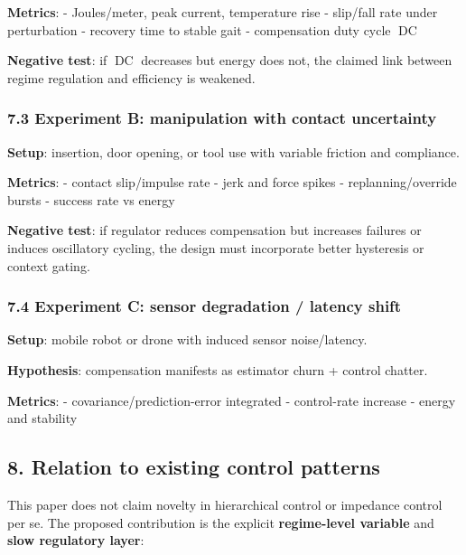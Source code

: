 \documentclass[11pt]{article}
\begin{document}
\textbf{Metrics}: - Joules/meter, peak current, temperature rise - slip/fall rate under perturbation - recovery time to stable gait - compensation duty cycle \(\operatorname{DC}\)

\textbf{Negative test}: if \(\operatorname{DC}\) decreases but energy does not, the claimed link between regime regulation and efficiency is weakened.

\hypertarget{experiment-b-manipulation-with-contact-uncertainty}{%
\subsubsection{7.3 Experiment B: manipulation with contact uncertainty}\label{experiment-b-manipulation-with-contact-uncertainty}}

\textbf{Setup}: insertion, door opening, or tool use with variable friction and compliance.

\textbf{Metrics}: - contact slip/impulse rate - jerk and force spikes - replanning/override bursts - success rate vs energy

\textbf{Negative test}: if regulator reduces compensation but increases failures or induces oscillatory cycling, the design must incorporate better hysteresis or context gating.

\hypertarget{experiment-c-sensor-degradation-latency-shift}{%
\subsubsection{7.4 Experiment C: sensor degradation / latency shift}\label{experiment-c-sensor-degradation-latency-shift}}

\textbf{Setup}: mobile robot or drone with induced sensor noise/latency.

\textbf{Hypothesis}: compensation manifests as estimator churn + control chatter.

\textbf{Metrics}: - covariance/prediction-error integrated - control-rate increase - energy and stability

\hypertarget{relation-to-existing-control-patterns}{%
\subsection{8. Relation to existing control patterns}\label{relation-to-existing-control-patterns}}

This paper does not claim novelty in hierarchical control or impedance control per se. The proposed contribution is the explicit \textbf{regime-level variable} and \textbf{slow regulatory layer}:
\end{document}
